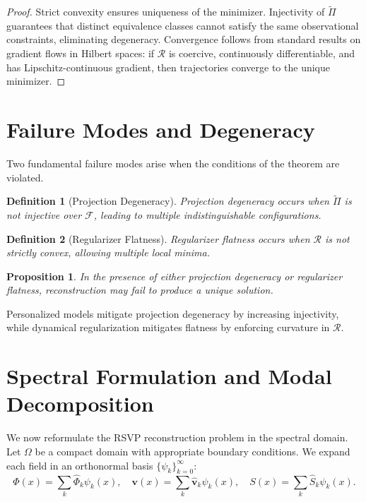 \documentclass[12pt]{article}
\newtheorem{definition}{Definition}
\newtheorem{proposition}{Proposition}
\begin{document}
\begin{proof}
Strict convexity ensures uniqueness of the minimizer. Injectivity of $\tilde{\Pi}$ guarantees that distinct equivalence classes cannot satisfy the same observational constraints, eliminating degeneracy. Convergence follows from standard results on gradient flows in Hilbert spaces: if $\mathcal{R}$ is coercive, continuously differentiable, and has Lipschitz-continuous gradient, then trajectories converge to the unique minimizer.
\end{proof}

\section{Failure Modes and Degeneracy}

Two fundamental failure modes arise when the conditions of the theorem are violated.

\begin{definition}[Projection Degeneracy]
Projection degeneracy occurs when $\tilde{\Pi}$ is not injective over $\mathcal{F}$, leading to multiple indistinguishable configurations.
\end{definition}

\begin{definition}[Regularizer Flatness]
Regularizer flatness occurs when $\mathcal{R}$ is not strictly convex, allowing multiple local minima.
\end{definition}

\begin{proposition}
In the presence of either projection degeneracy or regularizer flatness, reconstruction may fail to produce a unique solution.
\end{proposition}

Personalized models mitigate projection degeneracy by increasing injectivity, while dynamical regularization mitigates flatness by enforcing curvature in $\mathcal{R}$.

\section{Spectral Formulation and Modal Decomposition}

We now reformulate the RSVP reconstruction problem in the spectral domain. Let $\Omega$ be a compact domain with appropriate boundary conditions. We expand each field in an orthonormal basis $\{\psi_k\}_{k=0}^\infty$:
\[
\Phi(x) = \sum_{k} \hat{\Phi}_k \psi_k(x), \quad
\mathbf{v}(x) = \sum_{k} \hat{\mathbf{v}}_k \psi_k(x), \quad
S(x) = \sum_{k} \hat{S}_k \psi_k(x).
\]
\end{document}
